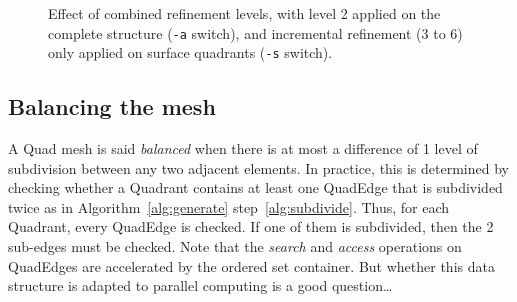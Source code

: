 \documentclass[10pt]{article}
\begin{document}
\begin{figure}[htb]
{  \label{f:pierefs5}
 }
\centering
 \caption{Effect of combined refinement levels, with level 2 applied on the complete structure (\texttt{-a} switch), and incremental refinement (3 to 6) only applied on surface quadrants (\texttt{-s} switch).}
\label{fig:pierefs}
\end{figure}

\subsection{Balancing the mesh}
A Quad mesh is said \textit{balanced} when there is at most a difference of 1 level of subdivision between any two adjacent elements. In practice, this is determined by checking whether a Quadrant contains at least one QuadEdge that is subdivided twice as in Algorithm~\ref{alg:generate} step~\ref{alg:subdivide}. Thus, for each Quadrant, every QuadEdge is checked. If one of them is subdivided, then the 2 sub-edges must be checked. Note that the \textit{search} and \textit{access} operations on QuadEdges are accelerated by the ordered set container. But whether this data structure is adapted to parallel computing is a good question\ldots
\end{document}
